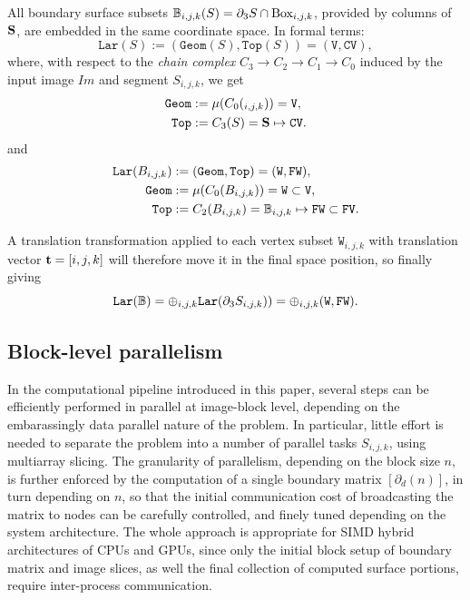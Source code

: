 \documentclass[11pt, oneside]{amsart}   	%
\begin{document}
All boundary surface subsets $\mathbb{B}_{i,j,k}(S) = \partial_3 S \cap \mbox{Box}_{i,j,k}$, provided by  columns of ${\bf S}$, are embedded in the same coordinate space. In formal terms: 
\[
\texttt{Lar}(S) := (\texttt{Geom}(S), \texttt{Top}(S)) = (\texttt{V}, \texttt{CV}),
\]
where, with respect to the \emph{chain complex} $C_3\to C_2\to C_1\to C_0$ induced by the input image $Im$ and segment $S_{i,j,k}$, we get
\begin{align}
\texttt{Geom} &:= \mu(C_0(_{i,j,k})) = \texttt{V},
\\
\texttt{Top} &:= C_3(S) = {\bf S} \mapsto \texttt{CV}.
\end{align}
and
\begin{align}
\texttt{Lar}(B_{i,j,k}) &:= (\texttt{Geom}, \texttt{Top}) = (\texttt{W}, \texttt{FW}),
\\
\texttt{Geom} &:= \mu(C_0(B_{i,j,k})) = \texttt{W} \subset \texttt{V},
\\
\texttt{Top} &:= C_2(B_{i,j,k}) = {\bf \mathbb{B}}_{i,j,k} \mapsto \texttt{FW} \subset \texttt{FV}.
\end{align}


A translation transformation applied to each vertex subset $\texttt{W}_{i,j,k}$ with translation  vector ${\bf t} = [i,j,k]$ will therefore move it in the final space position, so finally giving
\[
\texttt{Lar}(\mathbb{B}) = \oplus_{i,j,k}\texttt{Lar}(\partial_3 S_{i,j,k})) = \oplus_{i,j,k}(\texttt{W}, \texttt{FW}) .
\]


\subsection{Block-level parallelism}\label{sec:bbbb}

In the computational pipeline introduced in this paper, several steps can be efficiently performed in parallel at image-block level, depending on the embarassingly data parallel nature of the problem. In particular, little effort is needed to separate the problem into a number of parallel tasks $S_{i,j,k}$, using multiarray slicing. The granularity of parallelism, depending on the block size $n$, is further enforced by the computation of a single boundary matrix $[\partial_d(n)]$, in turn depending on $n$, so that the initial communication cost of broadcasting the matrix to nodes can be carefully controlled, and finely tuned depending on the system architecture. The whole approach is appropriate  for SIMD hybrid architectures of CPUs and GPUs, since only the initial block setup of boundary matrix and image slices, as well the final collection of computed surface portions, require inter-process communication.
\end{document}
